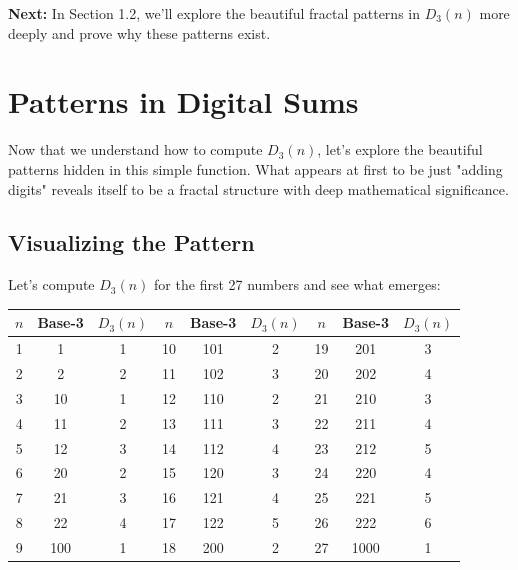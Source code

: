 \textbf{Next:} In Section 1.2, we'll explore the beautiful fractal patterns in $D_3(n)$ more deeply and prove why these patterns exist.


\section{Patterns in Digital Sums}
\label{sec:digital-sum-patterns}

Now that we understand how to compute $D_3(n)$, let's explore the beautiful patterns hidden in this simple function. What appears at first to be just "adding digits" reveals itself to be a fractal structure with deep mathematical significance.

\subsection{Visualizing the Pattern}
\label{subsec:visualizing-pattern}


Let's compute $D_3(n)$ for the first 27 numbers and see what emerges:

\begin{center}
\begin{tabular}{c|c|c||c|c|c||c|c|c}
$n$ & Base-3 & $D_3(n)$ & $n$ & Base-3 & $D_3(n)$ & $n$ & Base-3 & $D_3(n)$ \\
\hline
1 & 1 & 1 & 10 & 101 & 2 & 19 & 201 & 3 \\
2 & 2 & 2 & 11 & 102 & 3 & 20 & 202 & 4 \\
3 & 10 & 1 & 12 & 110 & 2 & 21 & 210 & 3 \\
4 & 11 & 2 & 13 & 111 & 3 & 22 & 211 & 4 \\
5 & 12 & 3 & 14 & 112 & 4 & 23 & 212 & 5 \\
6 & 20 & 2 & 15 & 120 & 3 & 24 & 220 & 4 \\
7 & 21 & 3 & 16 & 121 & 4 & 25 & 221 & 5 \\
8 & 22 & 4 & 17 & 122 & 5 & 26 & 222 & 6 \\
9 & 100 & 1 & 18 & 200 & 2 & 27 & 1000 & 1 \\
\end{tabular}
\end{center}

